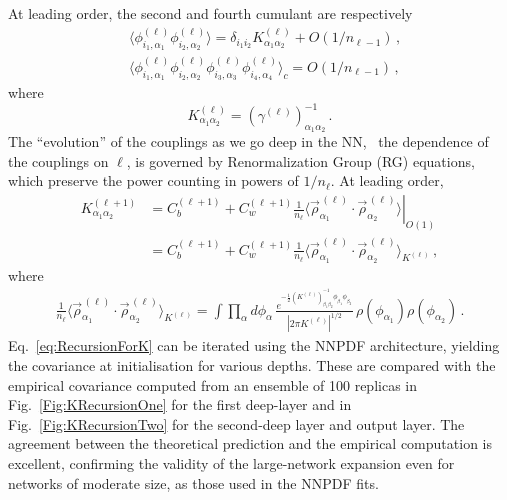 At leading order, the second and fourth cumulant are respectively
\begin{align}
    &\langle \phi^{(\ell)}_{i_1,\alpha_1} \phi^{(\ell)}_{i_2,\alpha_2}\rangle
      = \delta_{i_1 i_2} K^{(\ell)}_{\alpha_1\alpha_2} + O(1/n_{\ell-1})\, , \\
    &\langle \phi^{(\ell)}_{i_1,\alpha_1} \phi^{(\ell)}_{i_2,\alpha_2}
      \phi^{(\ell)}_{i_3,\alpha_3} \phi^{(\ell)}_{i_4,\alpha_4}\rangle_c
      = O(1/n_{\ell-1})\, ,
\end{align}
where
\begin{equation}
    \label{eq:DefineKmat}
    K^{(\ell)}_{\alpha_1\alpha_2} = \left(\gamma^{(\ell)}\right)^{-1}_{\alpha_1\alpha_2}\, .
\end{equation}
The ``evolution'' of the couplings as we go deep in the NN, \ie\ the dependence of the couplings on
$\ell$, is governed by Renormalization Group (RG) equations, which preserve the power counting in
powers of $1/n_{\ell}$. At leading order,
\begin{align}
    K^{(\ell+1)}_{\alpha_1\alpha_2} &=
      \left.
      C_b^{(\ell+1)} + C_w^{(\ell+1)} \frac{1}{n_\ell}
      \langle \vec{\rho}^{\,(\ell)}_{\alpha_1} \cdot
      \vec{\rho}^{\,(\ell)}_{\alpha_2} \rangle
      \right|_{O(1)} \\
      \label{eq:RecursionForK}
      &= C_b^{(\ell+1)} + C_w^{(\ell+1)} \frac{1}{n_\ell}
      \langle \vec{\rho}^{\,(\ell)}_{\alpha_1} \cdot
      \vec{\rho}^{\,(\ell)}_{\alpha_2} \rangle_{K^{(\ell)}}\, ,
\end{align}
where
\begin{align*}
    \frac{1}{n_\ell}
      \langle \vec{\rho}^{\,(\ell)}_{\alpha_1} \cdot
      \vec{\rho}^{\,(\ell)}_{\alpha_2} \rangle_{K^{(\ell)}} =
    \int \prod_{\alpha}d\phi_\alpha\,
      \frac{e^{-\frac12 \left(K^{(\ell)}\right)^{-1}_{\beta_1\beta_2}
        \phi_{\beta_1} \phi_{\beta_2}}}
        {\left|2\pi K^{(\ell)}\right|^{1/2}}\,
        \rho(\phi_{\alpha_1}) \rho(\phi_{\alpha_2})\, .
\end{align*}
Eq.~\eqref{eq:RecursionForK} can be iterated using the NNPDF architecture,
yielding the covariance at initialisation for various depths. These are compared
with the empirical covariance computed from an ensemble of 100 replicas in
Fig.~\ref{Fig:KRecursionOne} for the first deep-layer and in
Fig.~\ref{Fig:KRecursionTwo} for the second-deep layer and output layer. The
agreement between the theoretical prediction and the empirical computation is
excellent, confirming the validity of the large-network expansion even for
networks of moderate size, as those used in the NNPDF fits.

